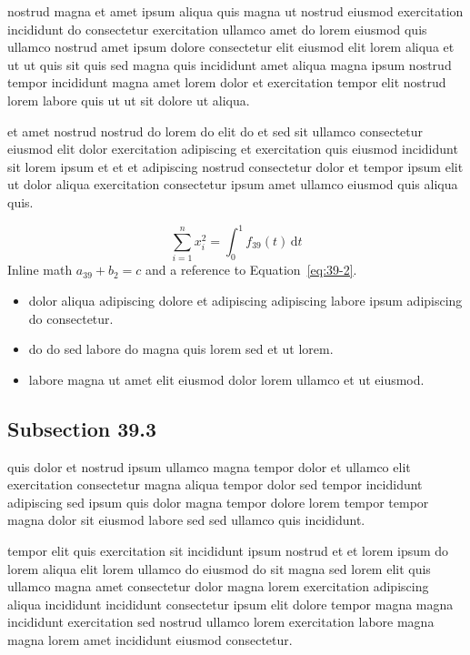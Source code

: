 \documentclass{article}
\begin{document}
nostrud magna et amet ipsum aliqua quis magna ut nostrud eiusmod exercitation incididunt do consectetur exercitation ullamco amet do lorem eiusmod quis ullamco nostrud amet ipsum dolore consectetur elit eiusmod elit lorem aliqua et ut ut quis sit quis sed magna quis incididunt amet aliqua magna ipsum nostrud tempor incididunt magna amet lorem dolor et exercitation tempor elit nostrud lorem labore quis ut ut sit dolore ut aliqua.

et amet nostrud nostrud do lorem do elit do et sed sit ullamco consectetur eiusmod elit dolor exercitation adipiscing et exercitation quis eiusmod incididunt sit lorem ipsum et et et adipiscing nostrud consectetur dolor et tempor ipsum elit ut dolor aliqua exercitation consectetur ipsum amet ullamco eiusmod quis aliqua quis.

\begin{equation}\label{eq:39-2}
  \sum_{i=1}^{n} x_i^{2} = \int_0^1 f_{39}(t)\,\mathrm{d}t
\end{equation}
Inline math $a_{39} + b_{2} = c$ and a reference to Equation~\eqref{eq:39-2}.

\begin{itemize}
  \item dolor aliqua adipiscing dolore et adipiscing adipiscing labore ipsum adipiscing do consectetur.
  \item do do sed labore do magna quis lorem sed et ut lorem.
  \item labore magna ut amet elit eiusmod dolor lorem ullamco et ut eiusmod.
\end{itemize}

\subsection{Subsection 39.3}\label{sec:39-3}
quis dolor et nostrud ipsum ullamco magna tempor dolor et ullamco elit exercitation consectetur magna aliqua tempor dolor sed tempor incididunt adipiscing sed ipsum quis dolor magna tempor dolore lorem tempor tempor magna dolor sit eiusmod labore sed sed ullamco quis incididunt.

tempor elit quis exercitation sit incididunt ipsum nostrud et et lorem ipsum do lorem aliqua elit lorem ullamco do eiusmod do sit magna sed lorem elit quis ullamco magna amet consectetur dolor magna lorem exercitation adipiscing aliqua incididunt incididunt consectetur ipsum elit dolore tempor magna magna incididunt exercitation sed nostrud ullamco lorem exercitation labore magna magna lorem amet incididunt eiusmod consectetur.
\end{document}
